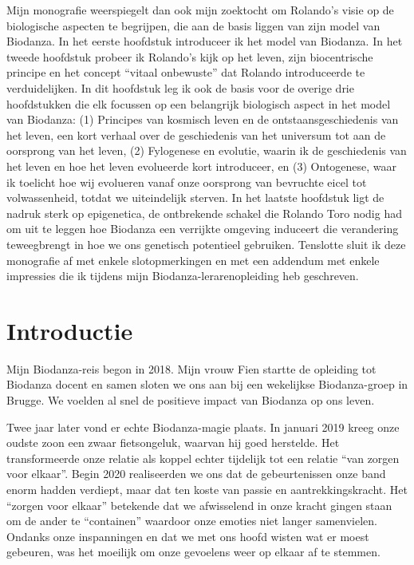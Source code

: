 \documentclass[
  11pt,
]{book}
\begin{document}
Mijn monografie weerspiegelt dan ook mijn zoektocht om Rolando's visie op de biologische aspecten te begrijpen, die aan de basis liggen van zijn model van Biodanza. In het eerste hoofdstuk introduceer ik het model van Biodanza. In het tweede hoofdstuk probeer ik Rolando's kijk op het leven, zijn biocentrische principe en het concept ``vitaal onbewuste'' dat Rolando introduceerde te verduidelijken. In dit hoofdstuk leg ik ook de basis voor de overige drie hoofdstukken die elk focussen op een belangrijk biologisch aspect in het model van Biodanza: (1) Principes van kosmisch leven en de ontstaansgeschiedenis van het leven, een kort verhaal over de geschiedenis van het universum tot aan de oorsprong van het leven, (2) Fylogenese en evolutie, waarin ik de geschiedenis van het leven en hoe het leven evolueerde kort introduceer, en (3) Ontogenese, waar ik toelicht hoe wij evolueren vanaf onze oorsprong van bevruchte eicel tot volwassenheid, totdat we uiteindelijk sterven. In het laatste hoofdstuk ligt de nadruk sterk op epigenetica, de ontbrekende schakel die Rolando Toro nodig had om uit te leggen hoe Biodanza een verrijkte omgeving induceert die verandering teweegbrengt in hoe we ons genetisch potentieel gebruiken. Tenslotte sluit ik deze monografie af met enkele slotopmerkingen en met een addendum met enkele impressies die ik tijdens mijn Biodanza-lerarenopleiding heb geschreven.

\hypertarget{intro}{%
\chapter{Introductie}\label{intro}}

Mijn Biodanza-reis begon in 2018. Mijn vrouw Fien startte de opleiding tot Biodanza docent en samen sloten we ons aan bij een wekelijkse Biodanza-groep in Brugge. We voelden al snel de positieve impact van Biodanza op ons leven.

Twee jaar later vond er echte Biodanza-magie plaats. In januari 2019 kreeg onze oudste zoon een zwaar fietsongeluk, waarvan hij goed herstelde. Het transformeerde onze relatie als koppel echter tijdelijk tot een relatie ``van zorgen voor elkaar''. Begin 2020 realiseerden we ons dat de gebeurtenissen onze band enorm hadden verdiept, maar dat ten koste van passie en aantrekkingskracht. Het ``zorgen voor elkaar'' betekende dat we afwisselend in onze kracht gingen staan om de ander te ``containen'' waardoor onze emoties niet langer samenvielen. Ondanks onze inspanningen en dat we met ons hoofd wisten wat er moest gebeuren, was het moeilijk om onze gevoelens weer op elkaar af te stemmen.
\end{document}
